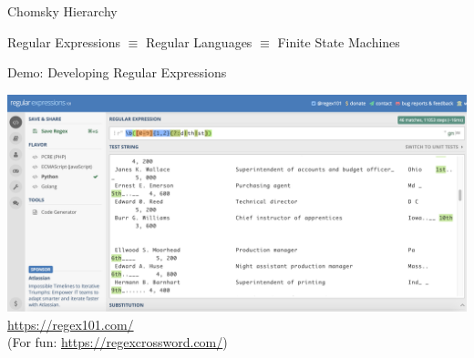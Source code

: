\documentclass[10pt]{beamer}
\begin{document}
\begin{frame}{Chomsky Hierarchy}
  \begin{center}
  \end{center}
  \alert{Regular Expressions} $\equiv$ \alert{Regular Languages} $\equiv$ \alert{Finite State Machines}
\end{frame}

\begin{frame}[fragile]{Demo: Developing Regular Expressions}

\begin{center}
  \includegraphics[scale=0.25]{figures/regex101-screenshot.png}
  \\ \vspace{1em}
  \textcolor{blue}{\url{https://regex101.com/}}
  \\
  (For fun: \textcolor{blue}{\url{https://regexcrossword.com/}})
\end{center}

\end{frame}
\end{document}

